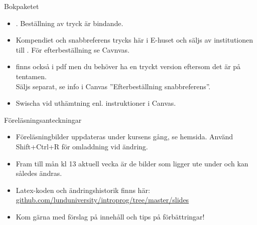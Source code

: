 \else


\begin{SlideExtra}{Bokpaketet}\SlideFontSmall
{}
\begin{itemize}
\item {}. Beställning av tryck är bindande.
\item Kompendiet och snabbreferens trycks här i E-huset och säljs av institutionen till . För efterbeställning se Cavnvas.
\item {} finns också i pdf men du behöver ha en tryckt version eftersom det är  på tentamen. \\ Säljs separat, se info i Canvas ''Efterbeställning snabbreferens''.
\item Swischa vid uthämtning enl. instruktioner i Canvas.

\end{itemize}
\end{SlideExtra}

\begin{SlideExtra}{Föreläsningsanteckningar}
\begin{itemize}
\item Föreläsningbilder uppdateras under kursens gång, se hemsida. Använd Shift+Ctrl+R för omladdning vid ändring.
\item Fram till mån kl 13 aktuell vecka är de bilder som ligger ute under  och kan således ändras.
\item Latex-koden och ändringshistorik finns här: \\
\href{https://github.com/lunduniversity/introprog/tree/master/slides}{github.com/lunduniversity/introprog/tree/master/slides}
\item Kom gärna med förslag på innehåll och tips på förbättringar!
\end{itemize}
\end{SlideExtra}
\fi

